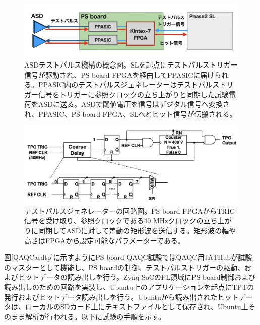 \begin{figure} 
\centering
\includegraphics[width=16cm]{fig/QAQC/PSBasdtp.png}
\caption[ASDテストパルスの概念図]{ASDテストパルス機構の概念図。SLを起点にテストパルストリガー信号が駆動され、PS board FPGAを経由してPPASICに届けられる。PPASIC内のテストパルスジェネレーターはテストパルストリガー信号をトリガーに参照クロックの立ち上がりと同期した試験電荷をASDに送る。ASDで閾値電圧を信号はデジタル信号へ変換され、PPASIC、PS board FPGA、SLへとヒット信号が伝搬される。}
\label{PSBasdtp}
\end{figure}

\begin{figure} 
    \centering
    \includegraphics[width=16cm]{fig/QAQC/PSBtpg.png}
    \caption[テストパルスジェネレーターの回路図]{テストパルスジェネレーターの回路図。PS board FPGAからTRIG信号を受け取り、参照クロックである40 MHzクロックの立ち上がりに同期してASDに対して差動の矩形波を送信する。矩形波の幅や高さはFPGAから設定可能なパラメーターである。}
    \label{PSBtpg}
\end{figure}

図\ref{QAQCasdtp}に示すようにPS board QAQC試験ではQAQC用JATHubが試験のマスターとして機能し、PS boardの制御、テストパルストリガーの駆動、およびヒットデータの読み出しを行う。Zynq SoCのPL領域にPS board制御および読み出しのための回路を実装し、Ubuntu上のアプリケーションを起点にTPTの発行およびヒットデータ読み出しを行う。Ubuntuから読み出されたヒットデータは、ローカルのSDカード上にテキストファイルとして保存され、Ubuntu上そのまま解析が行われる。以下に試験の手順を示す。


